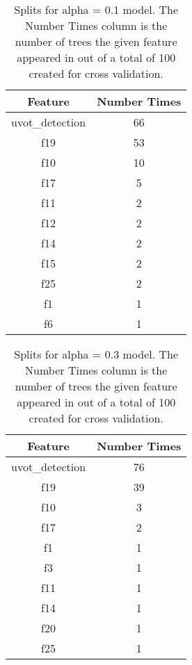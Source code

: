 \begin{table}[H]
\begin{center}
\begin{tabular}{cc}
  \hline
Feature & Number Times \\ 
  \hline
uvot\_detection & 66 \\ 
  f19 & 53 \\ 
  f10 & 10 \\ 
  f17 & 5 \\ 
  f11 & 2 \\ 
  f12 & 2 \\ 
  f14 & 2 \\ 
  f15 & 2 \\ 
  f25 & 2 \\ 
  f1 & 1 \\ 
  f6 & 1 \\ 
   \hline
\end{tabular}
\caption{Splits for alpha = 0.1 model. The Number Times column is the number of trees the given feature appeared in out of a total of 100 created for cross validation.}
\end{center}
\end{table}
\begin{table}[H]
\begin{center}
\begin{tabular}{cc}
  \hline
Feature & Number Times \\ 
  \hline
uvot\_detection & 76 \\ 
  f19 & 39 \\ 
  f10 & 3 \\ 
  f17 & 2 \\ 
  f1 & 1 \\ 
  f3 & 1 \\ 
  f11 & 1 \\ 
  f14 & 1 \\ 
  f20 & 1 \\ 
  f25 & 1 \\ 
   \hline
\end{tabular}
\caption{Splits for alpha = 0.3 model. The Number Times column is the number of trees the given feature appeared in out of a total of 100 created for cross validation.}
\end{center}
\end{table}
